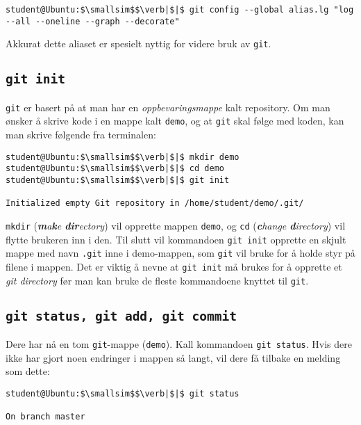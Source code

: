 \begin{alphasection}
\begin{lstlisting}[mathescape=true]
student@Ubuntu:$\smallsim$$\verb|$|$ git config --global alias.lg "log --all --oneline --graph --decorate"
\end{lstlisting}

Akkurat dette aliaset er spesielt nyttig for videre bruk av \verb|git|.




\subsection{\texttt{git init}}

\verb|git| er basert på at man har en \textit{oppbevaringsmappe} kalt repository. Om man ønsker å skrive kode i en mappe kalt \verb|demo|, og at \verb|git| skal følge med koden, kan man skrive følgende fra terminalen: 

\begin{lstlisting}[mathescape=true]
student@Ubuntu:$\smallsim$$\verb|$|$ mkdir demo
student@Ubuntu:$\smallsim$$\verb|$|$ cd demo
student@Ubuntu:$\smallsim$$\verb|$|$ git init

Initialized empty Git repository in /home/student/demo/.git/
\end{lstlisting}

\verb|mkdir| (\textit{\textbf{m}a\textbf{k}e \textbf{dir}ectory}) vil opprette mappen \verb|demo|, og \verb|cd| (\textit{\textbf{c}hange \textbf{d}irectory}) vil flytte brukeren inn i den. Til slutt vil kommandoen \verb|git init| opprette en skjult mappe med navn \verb|.git| inne i demo-mappen, som \verb|git| vil bruke for å holde styr på filene i mappen. Det er viktig å nevne at \verb|git init| må brukes for å opprette et \textit{git directory} før man kan bruke de fleste kommandoene knyttet til \verb|git|.

\subsection{\texttt{git status, git add, git commit}}


Dere har nå en tom \verb|git|-mappe (\verb|demo|). Kall kommandoen \verb|git status|. Hvis dere ikke har gjort noen endringer i mappen så langt, vil dere få tilbake en melding som dette:

\begin{lstlisting}[mathescape=true]
student@Ubuntu:$\smallsim$$\verb|$|$ git status

On branch master


\end{lstlisting}
\end{alphasection}
